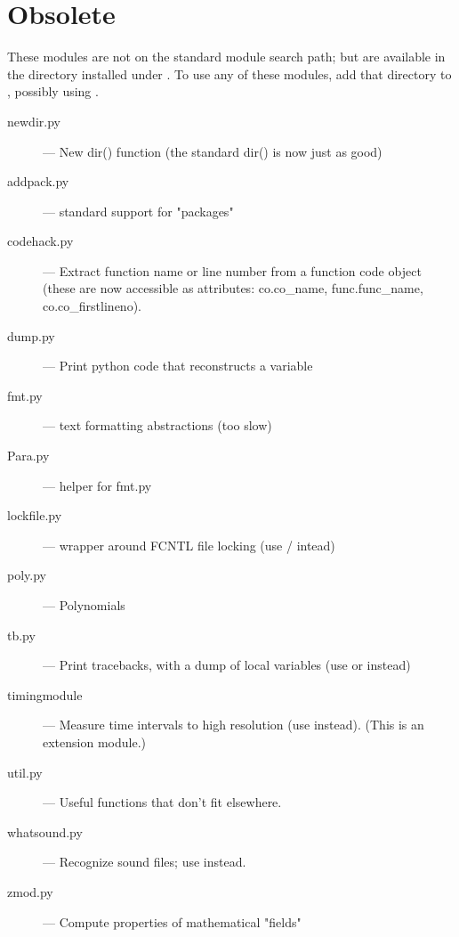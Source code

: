 \section{Obsolete}

These modules are not on the standard module search path;
but are available in the directory  installed  under
. %
To use any of these modules, add that directory to ,
possibly using .

\begin{description}
\item[newdir.py]
--- New dir() function (the standard dir() is now just as good)

\item[addpack.py]
--- standard support for "packages"

\item[codehack.py]
--- Extract function name or line number from a function
code object (these are now accessible as attributes: co.co_name,
func.func_name, co.co_firstlineno).

\item[dump.py]
--- Print python code that reconstructs a variable

\item[fmt.py]
--- text formatting abstractions (too slow)

\item[Para.py]
--- helper for fmt.py

\item[lockfile.py]
--- wrapper around FCNTL file locking (use
/ intead)

\item[poly.py]
--- Polynomials

\item[tb.py]
--- Print tracebacks, with a dump of local variables (use
 or  instead)

\item[timingmodule]
--- Measure time intervals to high resolution (use
 instead).  (This is an extension module.)

\item[util.py]
--- Useful functions that don't fit elsewhere.

\item[whatsound.py]
--- Recognize sound files; use  instead.

\item[zmod.py]
--- Compute properties of mathematical "fields"
\end{description}

